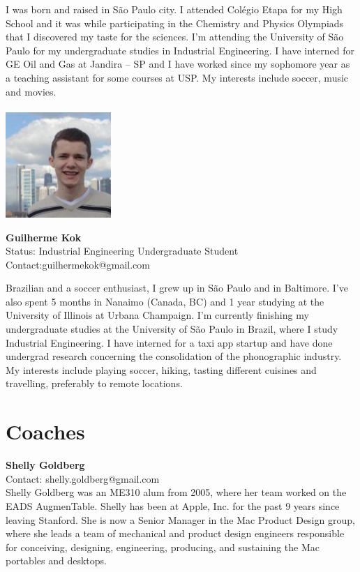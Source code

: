 I was born and raised in S\~{a}o Paulo city. I attended Colégio Etapa for my High School and it was while participating in the Chemistry and Physics Olympiads that I discovered my taste for the sciences. I'm attending the University of S\~{a}o Paulo for my undergraduate studies in Industrial Engineering. I have interned for GE Oil and Gas at Jandira – SP and I have worked since my sophomore year as a teaching assistant for some courses at USP. My interests include soccer, music and movies.
\\ \\

\noindent \includegraphics[width=40mm]{images/image016}
\parbox[b]{0.6\textwidth}{\textbf{Guilherme Kok}\\
Status: Industrial Engineering Undergraduate Student \\
Contact:guilhermekok@gmail.com  \\
}

Brazilian and a soccer enthusiast, I grew up in S\~{a}o Paulo and in Baltimore. I've also spent 5 months in Nanaimo (Canada, BC) and 1 year studying at the University of Illinois at Urbana Champaign. I'm currently finishing my undergraduate studies at the University of S\~{a}o Paulo in Brazil, where I study Industrial Engineering. I have interned for a taxi app startup and have done undergrad research concerning the consolidation of the phonographic industry. My interests include playing soccer, hiking, tasting different cuisines and travelling, preferably to remote locations. 
\\

\section{Coaches}

\textbf{Shelly Goldberg} \\
Contact: shelly.goldberg@gmail.com \\ 
Shelly Goldberg was an ME310 alum from 2005, where her team worked on the EADS AugmenTable.  Shelly has been at Apple, Inc. for the past 9 years since leaving Stanford.  She is now a Senior Manager in the Mac Product Design group, where she leads a team of mechanical and product design engineers responsible for conceiving, designing, engineering, producing, and sustaining the Mac portables and desktops.  
\\

